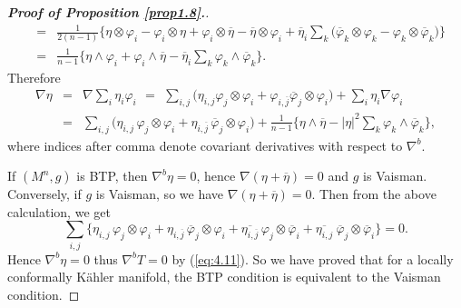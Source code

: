 \documentclass{amsart}
\numberwithin{equation}{section}
\theoremstyle{definition}
\renewcommand{\1}{\mathds{1}}
\renewcommand{\>}{\rightarrow}
\begin{document}
\begin{proof}[{\bf Proof of Proposition \ref{prop1.8}.}]
\begin{eqnarray*}
& = & \frac{1}{2(n-1)}\big\{ \eta \otimes \varphi_i - \varphi_i \otimes \eta + \varphi_i \otimes \overline{\eta } - \overline{\eta } \otimes \varphi_i + \overline{\eta}_i \sum_k \big( \overline{\varphi}_k \otimes \varphi_k - \varphi_k \otimes \overline{\varphi}_k \big) \big\} \\
& = & \frac{1}{n-1} \big\{ \eta \wedge \varphi_i + \varphi_i \wedge \overline{\eta} - \overline{\eta}_i \sum_k  \varphi_k\wedge \overline{\varphi}_k \big\}.
\end{eqnarray*}
Therefore
\begin{eqnarray*}
\nabla \eta & = & \nabla \sum_i \eta_i \varphi_i \  \, = \ \, \sum_{i,j} \big( \eta_{i,j} \varphi_j \otimes \varphi_i + \varphi_{i,\overline{j}} \overline{\varphi}_j \otimes \varphi_i \big) + \sum_i \eta_i \nabla \varphi_i \\
 & = & \sum_{i,j} \big( \eta_{i,j} \,\varphi_j \otimes \varphi_i + \eta_{i,\overline{j}} \,\overline{\varphi}_j \otimes \varphi_i \big) + \frac{1}{n-1} \big\{ \eta \wedge  \overline{\eta} - |\eta|^2  \sum_k  \varphi_k\wedge \overline{\varphi}_k \big\} ,
\end{eqnarray*}
where indices after comma denote covariant derivatives with respect to $\nabla^b$.

If $(M^n,g)$ is BTP, then $\nabla^b\eta=0$, hence $\nabla (\eta + \overline{\eta})=0$ and $g$ is Vaisman. Conversely, if $g$ is Vaisman, so we have $\nabla (\eta + \overline{\eta})=0$.
Then from the above calculation, we get
$$ \sum_{i,j} \{  \eta_{i,j} \,\varphi_j \otimes \varphi_i + \eta_{i,\overline{j}} \,\overline{\varphi}_j \otimes \varphi_i +  \overline{\eta_{i,\overline{j}}} \,\varphi_j \otimes \overline{\varphi}_i  + \overline{\eta_{i,j} } \ \overline{\varphi}_j \otimes \overline{\varphi}_i  \}  = 0.$$
Hence $\nabla^b \eta =0$ thus $\nabla^b T=0$ by (\ref{eq:4.11}). So we have proved that for a locally conformally K\"ahler manifold, the BTP condition is equivalent to the Vaisman condition.


\end{proof}
\end{document}
